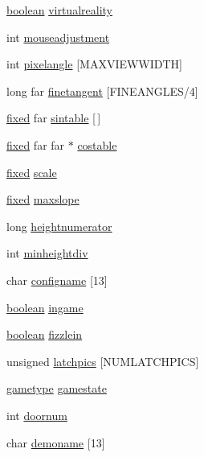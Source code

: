 \begin{DoxyCompactItemize}
\hyperlink{ID__HEAD_8H_a7c6368b321bd9acd0149b030bb8275ed}{boolean} \hyperlink{WL__DEF_8H_a19f0beeaba2b97e5c1c18467d930de1c}{virtualreality}
\item 
int \hyperlink{WL__DEF_8H_a8dcec22af342ab93acb6d66d85b69140}{mouseadjustment}
\item 
int \hyperlink{WL__DEF_8H_a9ceb403d754fafff34e7a5b735b3b4bb}{pixelangle} \mbox{[}MAXVIEWWIDTH\mbox{]}
\item 
long far \hyperlink{WL__DEF_8H_a35bd92058c61403699b4eff6184efeff}{finetangent} \mbox{[}FINEANGLES/4\mbox{]}
\item 
\hyperlink{WL__DEF_8H_aaf54715c9b83afe8794059fcf5fd5e7e}{fixed} far \hyperlink{WL__DEF_8H_a5e294958be89ffbb53d0139a72e80208}{sintable} \mbox{[}$\,$\mbox{]}
\item 
\hyperlink{WL__DEF_8H_aaf54715c9b83afe8794059fcf5fd5e7e}{fixed} far far $\ast$ \hyperlink{WL__DEF_8H_aca46d66cbad000de425a97b8607a54f0}{costable}
\item 
\hyperlink{WL__DEF_8H_aaf54715c9b83afe8794059fcf5fd5e7e}{fixed} \hyperlink{WL__DEF_8H_a849bfcd0a34b52dc70d3d9fa35a9ffc7}{scale}
\item 
\hyperlink{WL__DEF_8H_aaf54715c9b83afe8794059fcf5fd5e7e}{fixed} \hyperlink{WL__DEF_8H_ab4bad4ff8262f2f964b36bb50a8f890c}{maxslope}
\item 
long \hyperlink{WL__DEF_8H_aebfb0db84258aa5fc9301a200f96b8d3}{heightnumerator}
\item 
int \hyperlink{WL__DEF_8H_a45b3f03d729e26d91cddc22055a35e54}{minheightdiv}
\item 
char \hyperlink{WL__DEF_8H_af1798aca3dc8c86728240ad581d646f7}{configname} \mbox{[}13\mbox{]}
\item 
\hyperlink{ID__HEAD_8H_a7c6368b321bd9acd0149b030bb8275ed}{boolean} \hyperlink{WL__DEF_8H_aa5cd2906ddbef01eb4893f711504c438}{ingame}
\item 
\hyperlink{ID__HEAD_8H_a7c6368b321bd9acd0149b030bb8275ed}{boolean} \hyperlink{WL__DEF_8H_acfcefdf2f47adc93363a7557a347accd}{fizzlein}
\item 
unsigned \hyperlink{WL__DEF_8H_adbe64e9f4cdaee2e69ce2b915bd5c9ff}{latchpics} \mbox{[}NUMLATCHPICS\mbox{]}
\item 
\hyperlink{structgametype}{gametype} \hyperlink{WL__DEF_8H_a3aae581094bd3233febed90eb582c70d}{gamestate}
\item 
int \hyperlink{WL__DEF_8H_a270ac0143523da1acaf3ad63e7c9f103}{doornum}
\item 
char \hyperlink{WL__DEF_8H_acb52b6551afe5f2e9728a26e53761134}{demoname} \mbox{[}13\mbox{]}

\end{DoxyCompactItemize}
